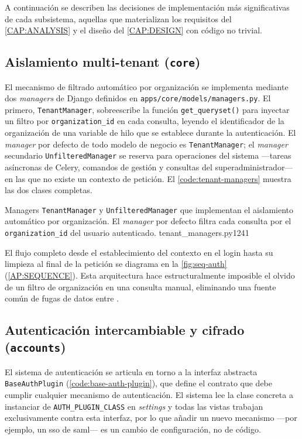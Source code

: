 A continuación se describen las decisiones de implementación más
significativas de cada subsistema, aquellas que materializan los
requisitos del \cref{CAP:ANALYSIS} y el diseño del \cref{CAP:DESIGN}
con código no trivial.


\subsection{Aislamiento multi-tenant (\texttt{core})}
\label{SS:IMPL-MULTITENANT}

El mecanismo de filtrado automático por organización se implementa
mediante dos \textit{managers} de Django definidos en
\texttt{apps/core/models/managers.py}. El primero, \texttt{TenantManager},
sobreescribe la función \texttt{get\_queryset()} para inyectar un filtro por
\texttt{organization\_id} en cada consulta, leyendo el identificador
de la organización de una variable de hilo que se establece durante
la autenticación. El \textit{manager} por defecto de todo modelo de
negocio es \texttt{TenantManager}; el \textit{manager} secundario
\texttt{UnfilteredManager} se reserva para operaciones del sistema
—tareas asíncronas de Celery, comandos de gestión y consultas del
superadministrador— en las que no existe un contexto de petición.
El \cref{code:tenant-managers} muestra las dos clases completas.

%
           {Managers \texttt{TenantManager} y \texttt{UnfilteredManager}
            que implementan el aislamiento automático por organización.
            El \textit{manager} por defecto filtra cada consulta por el
            \texttt{organization\_id} del usuario autenticado.}%
           {tenant_managers.py}{1}{24}{1}

El flujo completo desde el establecimiento del contexto en el login
hasta su limpieza al final de la petición se diagrama en la
\cref{fig:seq-auth} (\cref{AP:SEQUENCE}). Esta arquitectura hace
estructuralmente imposible el olvido de un filtro de organización en
una consulta manual, eliminando una fuente común de fugas de datos
entre .


\subsection{Autenticación intercambiable y cifrado (\texttt{accounts})}
\label{SS:IMPL-AUTH}

El sistema de autenticación se articula en torno a la interfaz
abstracta \texttt{BaseAuthPlugin} (\cref{code:base-auth-plugin}), que
define el contrato que debe cumplir cualquier mecanismo de
autenticación. El sistema lee la clase concreta a instanciar de
\texttt{AUTH\_PLUGIN\_CLASS} en \textit{settings} y todas las vistas
trabajan exclusivamente contra esta interfaz, por lo que añadir un
nuevo mecanismo —por ejemplo, un  \acs{sso} de
\acs{saml}— es un cambio de configuración, no de código.

